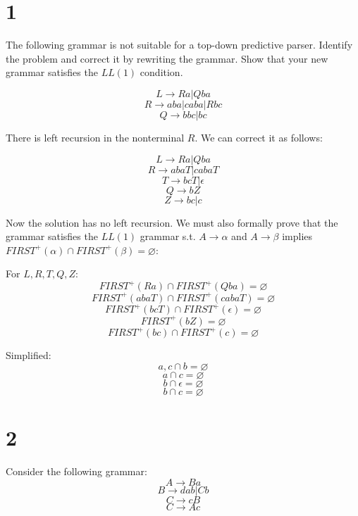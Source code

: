 \documentclass[11pt]{article}
\begin{document}
\section*{1}
The following grammar is not suitable for a top-down predictive parser. Identify the problem and correct it by rewriting the grammar. Show that your new grammar satisfies the $LL(1)$ condition.

$$L \rightarrow Ra | Qba$$
$$R \rightarrow aba | caba | Rbc$$
$$Q \rightarrow bbc | bc$$

\begin{Answer}
	There is left recursion in the nonterminal $R$. We can correct it as follows:

	$$L \rightarrow Ra | Qba$$
	$$R \rightarrow abaT | cabaT$$
	$$T \rightarrow bcT | \epsilon$$
	$$Q \rightarrow bZ$$
	$$Z \rightarrow bc | c$$

	Now the solution has no left recursion. We must also formally prove that the grammar satisfies the $LL(1)$ grammar s.t. $A \rightarrow \alpha$ and $A \rightarrow \beta$ implies $FIRST^+(\alpha) \cap FIRST^+(\beta) = \varnothing$:

	For $L, R, T, Q, Z$:
	$$FIRST^+(Ra) \cap FIRST^+(Qba) = \varnothing$$
	$$FIRST^+(abaT) \cap FIRST^+(cabaT) = \varnothing$$
	$$FIRST^+(bcT) \cap FIRST^+(\epsilon) = \varnothing$$
	$$FIRST^+(bZ) = \varnothing$$
	$$FIRST^+(bc) \cap FIRST^+(c) = \varnothing$$

	Simplified:
	$$a, c \cap b = \varnothing$$
	$$a \cap c = \varnothing$$
	$$b \cap \epsilon = \varnothing$$
	$$b \cap c = \varnothing$$
\end{Answer}

\newpage

\section*{2}
Consider the following grammar:
$$A \rightarrow Ba$$
$$B \rightarrow dab | Cb$$
$$C \rightarrow cB$$
$$C \rightarrow Ac$$
\end{document}
